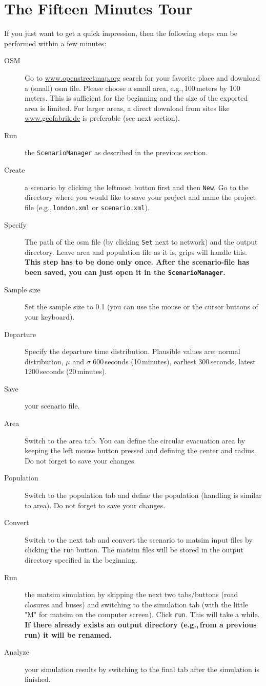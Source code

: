 \section{The Fifteen Minutes Tour}
\label{evac:section:fifteenminute}
If you just want to get a quick impression, then the following steps can be performed within a few minutes:
\begin{description}
\item[OSM] Go to \url{www.openstreetmap.org} search for your favorite place and download a (small) \gls{osm} file. Please choose a small area, e.g.,\,100\,meters by 100\,meters. This is sufficient for the beginning and the size of the exported area is limited. For larger areas, a direct download from sites like \url{www.geofabrik.de} is preferable (see next section).
\item[Run] the \lstinline|ScenarioManager| as described in the previous section.
\item[Create] a scenario by clicking the leftmost button first and then \lstinline|New|. Go to the directory where you would like to save your project and name the project file (e.g.,\,\lstinline|london.xml| or \lstinline|scenario.xml|).
\item[Specify] The path of the \gls{osm} file (by clicking \lstinline|Set| next to network) and the output directory. Leave area and population file as it is, \gls{grips} will handle this.
\textbf{This step has to be done only once. After the scenario-file has been saved, you can just open it in the \lstinline|ScenarioManager|.}
\item[Sample size] Set the sample size to 0.1 (you can use the mouse or the cursor buttons of your keyboard).
\item[Departure] Specify the departure time distribution. Plausible values are: normal distribution, $\mu$ and $\sigma$ 600\,seconds (10\,minutes), earliest 300\,seconds, latest 1200\,seconds (20\,minutes).
\item[Save] your scenario file.
\item[Area] Switch to the area tab. You can define the circular evacuation area by keeping the left mouse button pressed and defining the center and radius. Do not forget to save your changes.
\item[Population] Switch to the population tab and define the population (handling is similar to area). Do not forget to save your changes.
\item[Convert] Switch to the next tab and convert the scenario to \gls{matsim} input files by clicking the \lstinline|run| button. The \gls{matsim} files will be stored in the output directory specified in the beginning.
\item[Run] the \gls{matsim} simulation by skipping the next two tabs/buttons (road closures and buses) and switching to the simulation tab (with the little "M" for \gls{matsim} on the computer screen). Click \lstinline|run|. This will take a while.
\textbf{If there already exists an output directory (e.g.,\,from a previous run) it will be renamed.}
\item[Analyze] your simulation results by switching to the final tab after the simulation is finished.

\end{description}

